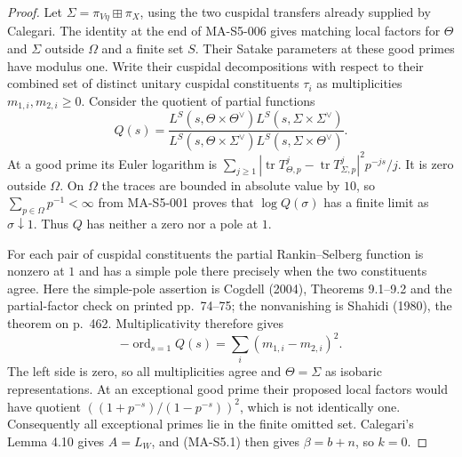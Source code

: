 \begin{proof}
Let $\Sigma=\pi_{V\eta}\boxplus\pi_X$, using the two cuspidal
transfers already supplied by Calegari. The identity at the end of
MA-S5-006 gives matching local factors for $\Theta$ and $\Sigma$
outside $\Omega$ and a finite set $S$. Their Satake parameters at
these good primes have modulus one. Write their cuspidal
decompositions with respect to their combined set of distinct
unitary cuspidal constituents $\tau_i$ as multiplicities
$m_{1,i},m_{2,i}\ge0$. Consider the quotient of partial functions
\[
 Q(s)=\frac{L^S(s,\Theta\times\Theta^\vee)
                 L^S(s,\Sigma\times\Sigma^\vee)}
                {L^S(s,\Theta\times\Sigma^\vee)
                 L^S(s,\Sigma\times\Theta^\vee)}.
\]
At a good prime its Euler logarithm is
$\sum_{j\ge1}|\operatorname{tr}T_{\Theta,p}^j-
\operatorname{tr}T_{\Sigma,p}^j|^2p^{-js}/j$.
It is zero outside $\Omega$. On $\Omega$ the traces are bounded
in absolute value by $10$, so $\sum_{p\in\Omega}p^{-1}<\infty$
from MA-S5-001 proves that $\log Q(\sigma)$ has a finite limit
as $\sigma\downarrow1$. Thus $Q$ has neither a zero nor a pole
at $1$.

For each pair of cuspidal constituents the partial
Rankin--Selberg function is nonzero at $1$ and has a simple pole
there precisely when the two constituents agree. Here the
simple-pole assertion is Cogdell (2004), Theorems 9.1--9.2 and the
partial-factor check on printed pp.~74--75; the nonvanishing is
Shahidi (1980), the theorem on p.~462. Multiplicativity therefore
gives
\[
 -\operatorname{ord}_{s=1}Q(s)
              =\sum_i(m_{1,i}-m_{2,i})^2.
\]
The left side is zero, so all multiplicities agree and
$\Theta=\Sigma$ as isobaric representations. At an exceptional
good prime their proposed local factors would have quotient
$((1+p^{-s})/(1-p^{-s}))^2$, which is not identically one.
Consequently all exceptional primes lie in the finite omitted
set. Calegari's Lemma 4.10 gives $A=L_W$, and (MA-S5.1)
then gives $\beta=b+n$, so $k=0$.
\end{proof}

